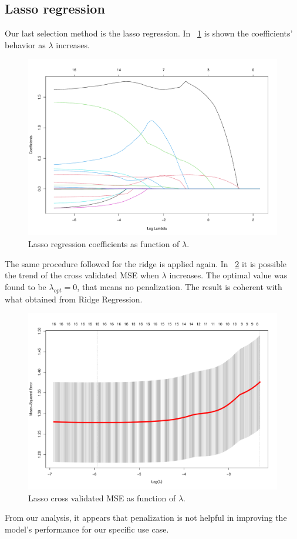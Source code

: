 \subsection{Lasso regression}

Our last selection method is the lasso regression. In \Fig~\ref{fig:LassoCoefVsLambda} is shown the coefficients' behavior as $\lambda$ increases. 

\begin{figure}[h]
	\centering
	\includegraphics[width=0.4\linewidth]{ImageFiles/Regression/Lasso/LassoCoefVsLambda}
	\caption{Lasso regression coefficients as function of $\lambda$.}
	\label{fig:LassoCoefVsLambda}
\end{figure}

The same procedure followed for the ridge is applied again. In \Fig~\ref{fig:LassoCvPlot} it is possible the trend of the cross validated MSE when $\lambda$ increases. The optimal value was found to be $\lambda_{opt} = 0$, that means no penalization. The result is coherent with what obtained from Ridge Regression.

\begin{figure}[h]
	\centering
	\includegraphics[width=0.5\linewidth]{ImageFiles/Regression/Lasso/LassoCvPlot}
	\caption{Lasso cross validated MSE as function of $\lambda$.}
	\label{fig:LassoCvPlot}
\end{figure}

From our analysis, it appears that penalization is not helpful in improving the model's performance for our specific use case.